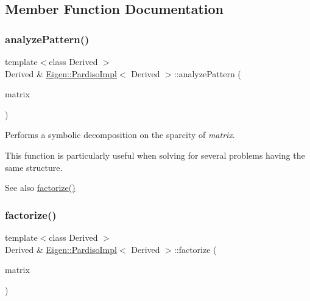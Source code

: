 \subsection{Member Function Documentation}
\mbox{\label{class_eigen_1_1_pardiso_impl_af1773ce06014b55a69cd42daf34eeec4}} 
\subsubsection{\texorpdfstring{analyzePattern()}{analyzePattern()}}
{\footnotesize\ttfamily template$<$class Derived $>$ \\
Derived \& \mbox{\hyperlink{class_eigen_1_1_pardiso_impl}{Eigen\+::\+Pardiso\+Impl}}$<$ Derived $>$\+::analyze\+Pattern (\begin{DoxyParamCaption}\item[{const Matrix\+Type \&}]{matrix }\end{DoxyParamCaption})}

Performs a symbolic decomposition on the sparcity of {\itshape matrix}.

This function is particularly useful when solving for several problems having the same structure.

\begin{DoxySeeAlso}{See also}
\mbox{\hyperlink{class_eigen_1_1_pardiso_impl_a6a4c092c5fb581a946d3c4e5ec347dfb}{factorize()}} 
\end{DoxySeeAlso}
\mbox{\label{class_eigen_1_1_pardiso_impl_a6a4c092c5fb581a946d3c4e5ec347dfb}} 
\subsubsection{\texorpdfstring{factorize()}{factorize()}}
{\footnotesize\ttfamily template$<$class Derived $>$ \\
Derived \& \mbox{\hyperlink{class_eigen_1_1_pardiso_impl}{Eigen\+::\+Pardiso\+Impl}}$<$ Derived $>$\+::factorize (\begin{DoxyParamCaption}\item[{const Matrix\+Type \&}]{matrix }\end{DoxyParamCaption})}

